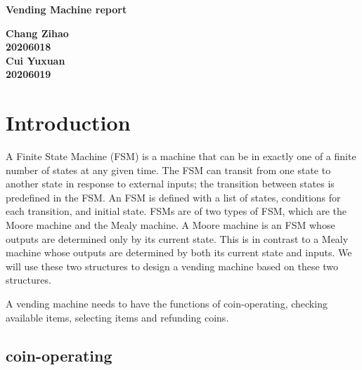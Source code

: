 \documentclass[12pt,a4paper]{article}
\begin{document}
\begin{titlepage}
  \begin{center}
    \vspace*{1cm}

    \textbf{\Huge Vending Machine  report}

    \vspace{0.5cm}

         
    \vspace{1.5cm}

    \textbf{\large Chang Zihao \\20206018\\\large Cui Yuxuan\\20206019}

    \vfill
         

         
    \vspace{0.8cm}
  


         
\end{center}
\end{titlepage}


\newpage
\tableofcontents
\thispagestyle{empty}

\newpage
{}
\setcounter{page}{1}

\section{Introduction}

A Finite State Machine (FSM) is a machine that can be in exactly one of a finite number of states at any given time. 
The FSM can transit from one state to another state in response to external inputs; 
the transition between states is predefined in the FSM. 
An FSM is defined with a list of states, conditions for each transition, and initial state. 
FSMs are of two types of FSM, which are the Moore machine and the Mealy machine. 
A Moore machine is an FSM whose outputs are determined only by its current state. 
This is in contrast to a Mealy machine whose outputs are determined by both its current state and inputs. 
We will use these two structures to design a vending machine based on these two structures.


A vending machine needs to have the functions of coin-operating, checking available items, selecting items and refunding coins.

\subsection{coin-operating}
\end{document}
